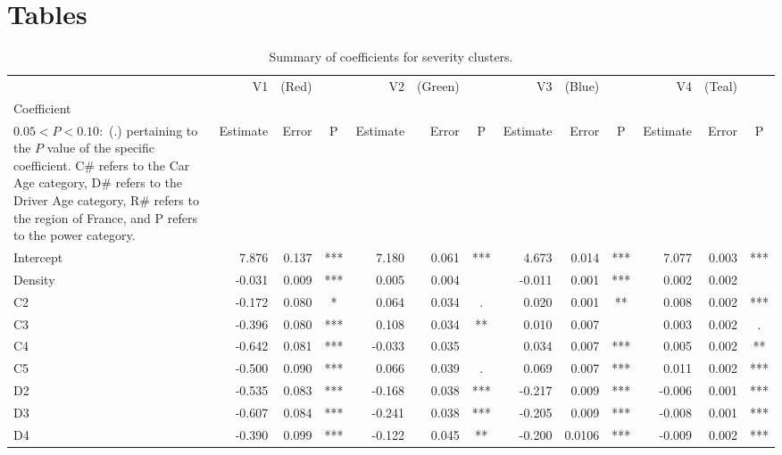 \documentclass[11pt,letterpaper]{article}
\numberwithin{equation}{section}
\numberwithin{equation}{section}
\numberwithin{equation}{section}
\begin{document}
\section{Tables}\label{app:tables}

\begin{center}
\begin{table}
\caption{ Summary of coefficients for severity clusters.}
\label{severity_coef_table}
\begin{tabular}{|l|rrc|rrc|rrc|rrc|}
\hline\hline
         & V1         & (Red)     &    & V2         & (Green)   &    & V3          & (Blue)     &    & V4          & (Teal)     &    \\
Coefficient \footnote{The significance codes are defined as $  P < 0.001 : $  (***), $0.001 < P < 0.01:$ (**), $  0.01 < P < 0.05:$ (*),\\ $0.05 < P < 0.10 : $ (.) %
pertaining to the $P$ value of the specific coefficient. C\# refers to the Car Age category, D\# refers to the Driver Age category, R\# refers to the region of France, and P refers to the power category.  }      & Estimate   & Error     & P   & Estimate   & Error     & P   & Estimate    & Error      & P   & Estimate    & Error      & P   \\ \hline
Intercept & 7.876  & 0.137 & *** & 7.180  & 0.061 & *** & 4.673   & 0.014 & *** & 7.077  & 0.003 & *** \\
Density   & -0.031 & 0.009 & *** & 0.005  & 0.004 &     & -0.011 & 0.001 & *** & 0.002  & 0.002 &     \\
C2        & -0.172 & 0.080 & *   & 0.064  & 0.034 & .   & 0.020 & 0.001 & **  & 0.008  & 0.002 & *** \\
C3        & -0.396 & 0.080 & *** & 0.108  & 0.034 & **  & 0.010  & 0.007 &     & 0.003  & 0.002 & .   \\
C4        & -0.642 & 0.081 & *** & -0.033 & 0.035 &     & 0.034  & 0.007 & *** & 0.005  & 0.002 & **  \\
C5        & -0.500 & 0.090 & *** & 0.066 & 0.039 & .   & 0.069  & 0.007 & *** & 0.011  & 0.002 & *** \\
D2        & -0.535 & 0.083 & *** & -0.168 & 0.038 & *** & -0.217 & 0.009 & *** & -0.006 & 0.001 & *** \\
D3        & -0.607  & 0.084 & *** & -0.241 & 0.038 & *** & -0.205 & 0.009 & *** & -0.008 & 0.001 & *** \\
D4        & -0.390 & 0.099 & *** & -0.122 & 0.045 & **  & -0.200 & 0.0106 & *** & -0.009  & 0.002 & *** \\

\end{tabular}
\end{table}
\end{center}
\end{document}
